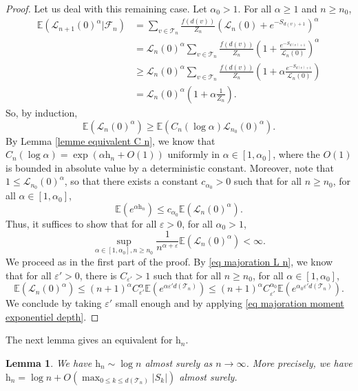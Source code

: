 \documentclass[11pt]{article}
\newtheorem{lemma}[theorem]{Lemma}
\numberwithin{equation}{section}
\def\vp{\varepsilon}
\def \T{\mathcal{T}}
\def \cL{\mathcal{L}}
\def\E{\mathbb{E}}
\begin{document}
\begin{proof}
Let us deal with this remaining case. Let $\alpha_0>1$. For all $\alpha\ge 1$ and $n\ge n_0$, 
\begin{align*}\E(\cL_{n+1}(0)^\alpha \vert \mathcal{F}_n) &=\sum_{v \in \T_n}  \frac{f(d(v))}{Z_n} \left( \cL_n(0) + e^{-S_{d(v)+1}} \right)^\alpha  \\&= \cL_n(0)^\alpha \sum_{v \in \T_n}  \frac{f(d(v))}{Z_n} \left( 1 + \frac{e^{-S_{d(v)+1}} }{\cL_n(0)}\right)^\alpha
	\\
	&\ge \cL_n(0)^\alpha \sum_{v \in \T_n} \frac{f(d(v))}{Z_n} \left( 1 +\alpha \frac{e^{-S_{d(v)+1}} }{\cL_n(0)}\right)\\
	&= \cL_n(0)^\alpha  \left( 1+ \alpha \frac{1}{Z_n} \right).
 \end{align*}
 So, by induction,
 \[
 \E(\cL_n(0)^\alpha) \ge \E \left(C_n(\log \alpha) \cL_{n_0}(0)^\alpha\right).
 \]
 By Lemma \ref{lemme equivalent C n}, we know that $C_n(\log \alpha) = \exp (\alpha\mathrm{h}_n + O(1))$ uniformly in $\alpha \in [1, \alpha_0]$, where the $O(1)$ is bounded in absolute value by a deterministic constant. Moreover, note that $1 \le \cL_{n_0}(0)^\alpha$, so that there exists a constant $c_{\alpha_0}>0$ such that for all $n\ge n_0$, for all $\alpha \in [1, \alpha_0]$,
 \[
 \E\left(e^{\alpha\mathrm{h}_n} \right) \le  c_{\alpha_0}\E(\cL_n(0)^\alpha).
 \]
 Thus, it suffices to show that for all $\vp>0$, for all $\alpha_0>1$,
 \[
 \sup_{\alpha \in [1, \alpha_0], n\ge n_0} \frac{1}{n^{\alpha+\vp}} \E\left(\cL_n(0)^\alpha \right) <\infty.
 \]
 We proceed as in the first part of the proof. By \eqref{eq majoration L n}, we know that for all $\vp'>0$, there is $C_{\vp'}>1$ such that for all $n\ge n_0$, for all $\alpha \in [1, \alpha_0]$,
 \[
 \E\left( \cL_n(0)^\alpha \right) \le (n+1)^\alpha C_{\vp'}^\alpha \E\left(e^{\alpha \vp' d(\T_n)} \right)\le (n+1)^\alpha C_{\vp'}^{\alpha_0} \E\left(e^{\alpha_0 \vp' d(\T_n)} \right).
 \]
 We conclude by taking $\vp'$ small enough and by applying \eqref{eq majoration moment exponentiel depth}.
\end{proof}
The next lemma gives an equivalent for $\mathrm{h}_n$.
\begin{lemma}\label{lemme equivalent ps h n}
	We have $\mathrm{h}_n \sim \log n$ almost surely as $n\to \infty$. More precisely, we have $\mathrm{h}_n= \log n + O(\max_{0 \le k \le d(\T_n)}\vert S_k\vert)$ almost surely.
\end{lemma}
\end{document}
